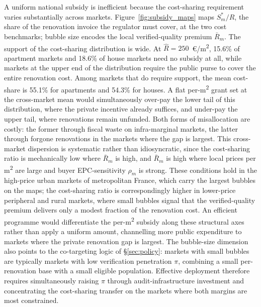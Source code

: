 \documentclass[10pt,letterpaper]{bp-template-concise}
\begin{document}
A uniform national subsidy is inefficient because the cost-sharing requirement varies substantially across markets. Figure~\ref{fig:subsidy_maps} maps $S^*_m / \hat{R}$, the share of the renovation invoice the regulator must cover, at the two cost benchmarks; bubble size encodes the local verified-quality premium $\bar{R}_m$. The support of the cost-sharing distribution is wide. At $\hat{R} = 250$~\euro{}/m\textsuperscript{2}, 15.6\% of apartment markets and 18.6\% of house markets need no subsidy at all, while markets at the upper end of the distribution require the public purse to cover the entire renovation cost. Among markets that do require support, the mean cost-share is 55.1\% for apartments and 54.3\% for houses. A flat per-m\textsuperscript{2} grant set at the cross-market mean would simultaneously over-pay the lower tail of this distribution, where the private incentive already suffices, and under-pay the upper tail, where renovations remain unfunded. Both forms of misallocation are costly: the former through fiscal waste on infra-marginal markets, the latter through forgone renovations in the markets where the gap is largest. This cross-market dispersion is systematic rather than idiosyncratic, since the cost-sharing ratio is mechanically low where $\bar{R}_m$ is high, and $\bar{R}_m$ is high where local prices per m\textsuperscript{2} are large and buyer EPC-sensitivity $\rho_m$ is strong. These conditions hold in the high-price urban markets of metropolitan France, which carry the largest bubbles on the maps; the cost-sharing ratio is correspondingly higher in lower-price peripheral and rural markets, where small bubbles signal that the verified-quality premium delivers only a modest fraction of the renovation cost. An efficient programme would differentiate the per-m\textsuperscript{2} subsidy along these structural axes rather than apply a uniform amount, channelling more public expenditure to markets where the private renovation gap is largest. The bubble-size dimension also points to the co-targeting logic of \S\ref{sec:policy}: markets with small bubbles are typically markets with low verification penetration $\pi$, combining a small per-renovation base with a small eligible population. Effective deployment therefore requires simultaneously raising $\pi$ through audit-infrastructure investment and concentrating the cost-sharing transfer on the markets where both margins are most constrained.
\end{document}
